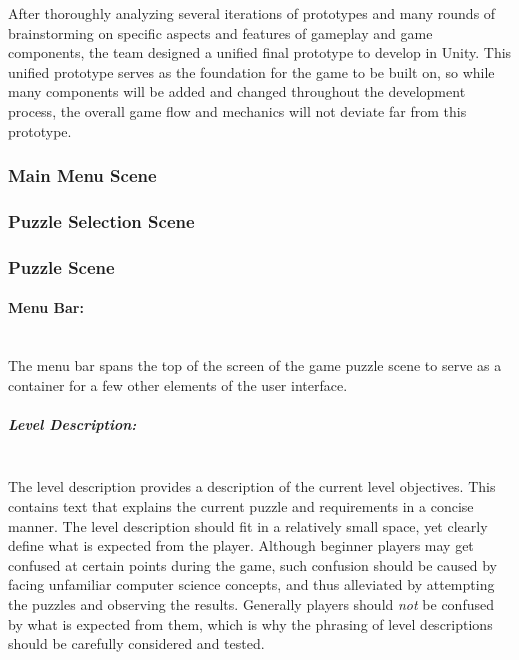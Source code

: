 

After thoroughly analyzing several iterations of prototypes and many rounds of brainstorming on specific aspects and features of gameplay and game components, the team designed a unified final prototype to develop in Unity.
This unified prototype serves as the foundation for the game to be built on, so while many components will be added and changed throughout the development process, the overall game flow and mechanics will not deviate far from this prototype.





\subsubsection{Main Menu Scene}





\subsubsection{Puzzle Selection Scene}




\subsubsection{Puzzle Scene}

	\paragraph{Menu Bar:} ~\\
	The menu bar spans the top of the screen of the game puzzle scene to serve as a container for a few other elements of the user interface.

		\subparagraph{Level Description:} ~\\
		The level description provides a description of the current level objectives. This contains text that explains the current puzzle and requirements in a concise manner. The level description should fit in a relatively small space, yet clearly define what is expected from the player.
		Although beginner players may get confused at certain points during the game, such confusion should be caused by facing unfamiliar computer science concepts, and thus alleviated by attempting the puzzles and observing the results. Generally players should \textit{not} be confused by what is expected from them, which is why the phrasing of level descriptions should be carefully considered and tested.


